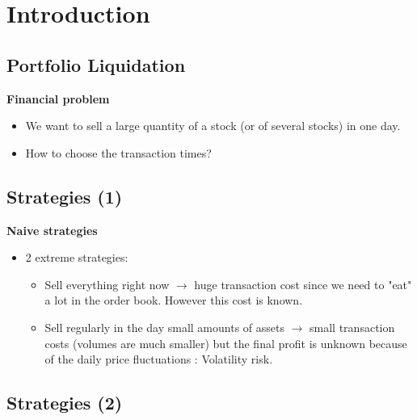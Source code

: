 \documentclass[10pt]{article}
\begin{document}



\section{Introduction} 

\subsection{Portfolio Liquidation}

\textbf{Financial problem}

\begin{itemize} 
    \item We want to sell a large quantity of a stock (or of several stocks) in one day.
    \item How to choose the transaction times?
\end{itemize}

\subsection{Strategies (1)}

\textbf{Naive strategies}

\begin{itemize} 
    \item 2 extreme strategies:
    \begin{itemize} 
        \item Sell everything right now $\rightarrow$ huge transaction cost since we need to "eat" a lot in the order book. However this cost is known.
        \item Sell regularly in the day small amounts of assets $\rightarrow$ small transaction costs (volumes are much smaller) but the final profit is unknown because of the daily price fluctuations :
        Volatility risk.
    \end{itemize}
\end{itemize}

\subsection{Strategies (2)}
\end{document}
